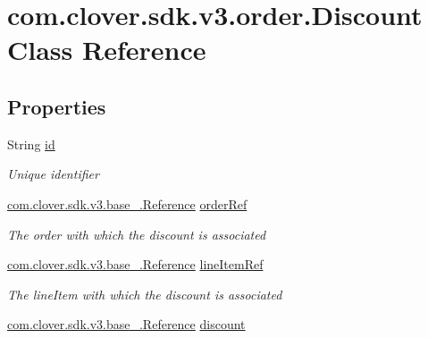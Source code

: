 \hypertarget{classcom_1_1clover_1_1sdk_1_1v3_1_1order_1_1_discount}{}\section{com.\+clover.\+sdk.\+v3.\+order.\+Discount Class Reference}
\label{classcom_1_1clover_1_1sdk_1_1v3_1_1order_1_1_discount}
\subsection*{Properties}
\begin{DoxyCompactItemize}
\item 
String \hyperlink{classcom_1_1clover_1_1sdk_1_1v3_1_1order_1_1_discount_aa2c3e145ab182c1f49c2a6f865365981}{id}
\begin{DoxyCompactList}\small\item\em Unique identifier \end{DoxyCompactList}\item 
\hyperlink{classcom_1_1clover_1_1sdk_1_1v3_1_1base___1_1_reference}{com.\+clover.\+sdk.\+v3.\+base\+\_\+.\+Reference} \hyperlink{classcom_1_1clover_1_1sdk_1_1v3_1_1order_1_1_discount_a58b38e2a47d6bd4f0b1ee9353dd0d7a0}{order\+Ref}
\begin{DoxyCompactList}\small\item\em The order with which the discount is associated \end{DoxyCompactList}\item 
\hyperlink{classcom_1_1clover_1_1sdk_1_1v3_1_1base___1_1_reference}{com.\+clover.\+sdk.\+v3.\+base\+\_\+.\+Reference} \hyperlink{classcom_1_1clover_1_1sdk_1_1v3_1_1order_1_1_discount_a570b3100cba31b8a979829f9daf63804}{line\+Item\+Ref}
\begin{DoxyCompactList}\small\item\em The line\+Item with which the discount is associated \end{DoxyCompactList}\item 
\hyperlink{classcom_1_1clover_1_1sdk_1_1v3_1_1base___1_1_reference}{com.\+clover.\+sdk.\+v3.\+base\+\_\+.\+Reference} \hyperlink{classcom_1_1clover_1_1sdk_1_1v3_1_1order_1_1_discount_a6447f1e7eef9a5c388bf904b5cc1e8c8}{discount}

\end{DoxyCompactItemize}
